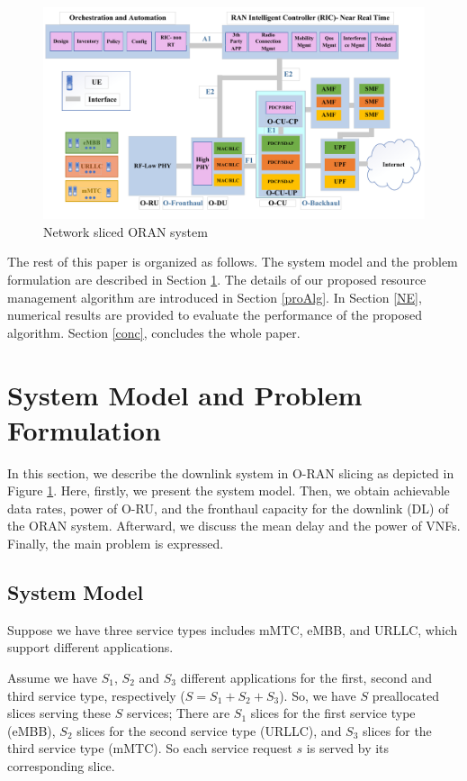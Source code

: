 \documentclass[conference]{IEEEtran}
\begin{document}
\begin{figure}
  \centering 
    \includegraphics[scale = 0.75]{finalDraw.pdf}
  \caption{Network sliced ORAN system}
  \label{fig:c11}
\end{figure}

The rest of this paper is organized as follows. The system model and the problem formulation are described in Section \ref{systemmodel}. The details of our proposed resource management algorithm are introduced in Section \ref{proAlg}. In Section \ref{NE}, numerical results are provided to evaluate the performance of the proposed algorithm. Section \ref{conc}, concludes the whole paper.

\section{System Model and Problem Formulation}\label{systemmodel}

In this section, we describe the downlink system in O-RAN slicing as depicted in Figure \ref{fig:c11}. 
Here, firstly, we present the system model. Then, we obtain achievable data rates, power of O-RU, and the fronthaul capacity for the downlink (DL) of the ORAN system. Afterward, we discuss the mean delay and the power of VNFs.
Finally, the main problem is expressed.
\subsection{System Model}
Suppose we have three service types includes mMTC, eMBB, and URLLC, which support different applications.

Assume we have $S_1$, $S_2$ and $S_3$ different applications for the first, second and third service type, respectively ($S = S_1 + S_2 + S_3$).
So, we have $S$ preallocated slices serving these $S$ services; There are $S_1$ slices for the first service type (eMBB), $S_2$ slices for the second service type (URLLC), and $S_3$ slices for the third service type (mMTC). So each service request $s$ is served by its corresponding slice.
\end{document}
